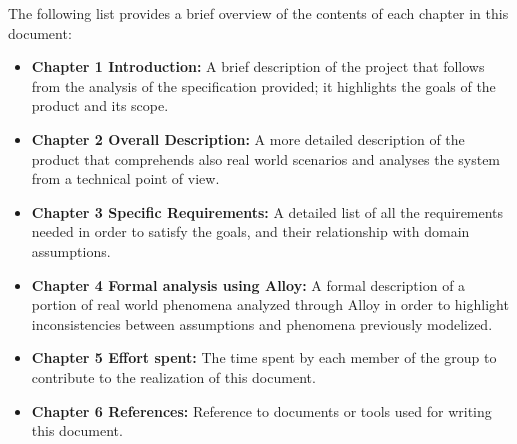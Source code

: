 The following list provides a brief overview of the contents of each chapter in this document:

\begin{itemize}
    \item \textbf{Chapter 1 Introduction:} A brief description of the project that follows from the analysis of the specification provided; it highlights the goals of the product and its scope.
    
    \item \textbf{Chapter 2 Overall Description:} A more detailed description of the product that comprehends also real world scenarios and analyses the system from a technical point of view.
    
    \item \textbf{Chapter 3 Specific Requirements:} A detailed list of all the requirements needed in order to satisfy the goals, and their relationship with domain assumptions.
    
    \item \textbf{Chapter 4 Formal analysis using Alloy:} A formal description of a portion of real world phenomena analyzed through Alloy in order to highlight inconsistencies between assumptions and phenomena previously modelized.
    
    \item \textbf{Chapter 5 Effort spent:} The time spent by each member of the group to contribute to the realization of this document.
    
    \item \textbf{Chapter 6 References:} Reference to documents or tools used for writing this document.
\end{itemize}